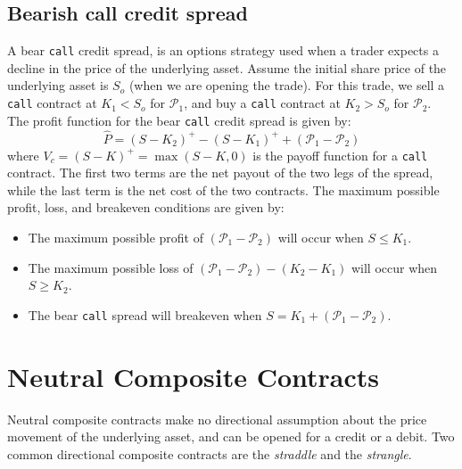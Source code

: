 \documentclass[11pt]{article}
\theoremstyle{definition}
\begin{document}
\subsection*{Bearish call credit spread}
A bear \texttt{call} credit spread, is an options strategy used 
when a trader expects a decline in the price of the underlying asset. 
Assume the initial share price of the underlying asset is $S_{o}$ (when we are opening the trade).
For this trade, we sell a \texttt{call} contract at $K_{1}<S_{o}$ for $\mathcal{P}_{1}$, 
and buy a \texttt{call} contract at $K_{2}>S_{o}$ for $\mathcal{P}_{2}$. The profit function 
for the bear \texttt{call} credit spread is given by:
\begin{equation}
\hat{P} = (S-K_{2})^{+} - (S-K_{1})^{+} + (\mathcal{P}_{1}-\mathcal{P}_{2})
\end{equation}
where $V_{c} = (S-K)^{+}=\max(S-K,0)$ is the payoff function for a \texttt{call} contract. 
The first two terms are the net payout of the two legs of the spread, while the last term is the net cost of the two contracts. 
The maximum possible profit, loss, and breakeven conditions are given by:
\begin{itemize}
\item{The maximum possible profit of $\left(\mathcal{P}_{1} - \mathcal{P}_{2}\right)$ will occur when $S\leq{K_{1}}$.}
\item{The maximum possible loss of $\left(\mathcal{P}_{1} - \mathcal{P}_{2}\right) -(K_{2} - K_{1})$ will occur when $S\geq{K_{2}}$.}
\item{The bear \texttt{call} spread will breakeven when $S =  K_{1}+\left(\mathcal{P}_{1} - \mathcal{P}_{2}\right)$.}
\end{itemize}

\section*{Neutral Composite Contracts}
Neutral composite contracts make no directional assumption about the price movement of the underlying asset, and can be opened for a credit or a debit.
Two common directional composite contracts are the \textit{straddle} and the \textit{strangle}.	
\end{document}
